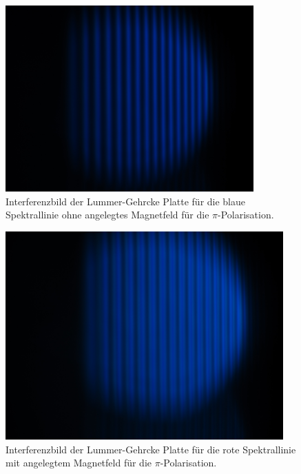 \begin{figure}[h!]
  \centering
  \includegraphics[width=0.85\textwidth]{data/temp/blau_ohneB_90.JPG}
  \caption{Interferenzbild der Lummer-Gehrcke Platte für die blaue Spektrallinie ohne angelegtes Magnetfeld für die $\pi$-Polarisation.}
  \label{fig:blauOhneB90}
\end{figure}
\begin{figure}[h!]
  \centering
  \includegraphics[width=0.95\textwidth]{data/temp/blau_mitB_90.JPG}
  \caption{Interferenzbild der Lummer-Gehrcke Platte für die rote Spektrallinie mit angelegtem Magnetfeld für die $\pi$-Polarisation.}
  \label{fig:blauMitB90}
\end{figure}
